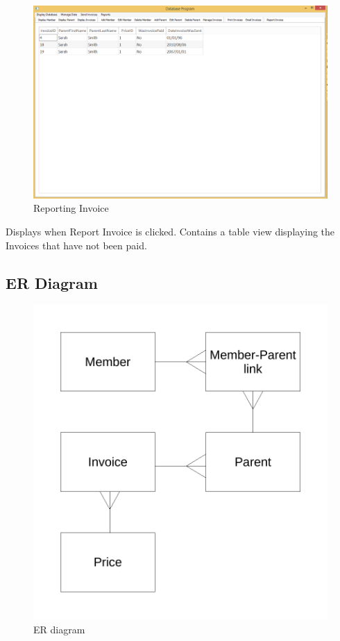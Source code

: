 \begin{figure}[H]
\includegraphics[width=\textwidth]{./Maintenance/Images/ReportInvoice.png}
    \caption{Reporting Invoice} \label{fig:report_invoice}
\end{figure}

Displays when Report Invoice is clicked. Contains a table view displaying the Invoices that have not been paid.

\subsection{ER Diagram}
\begin{figure}[H]
\includegraphics[width=\textwidth]{./Design/images/ER_diagram_design.pdf}
    \caption{ER diagram} \label{fig:ER_diagram}
\end{figure}

